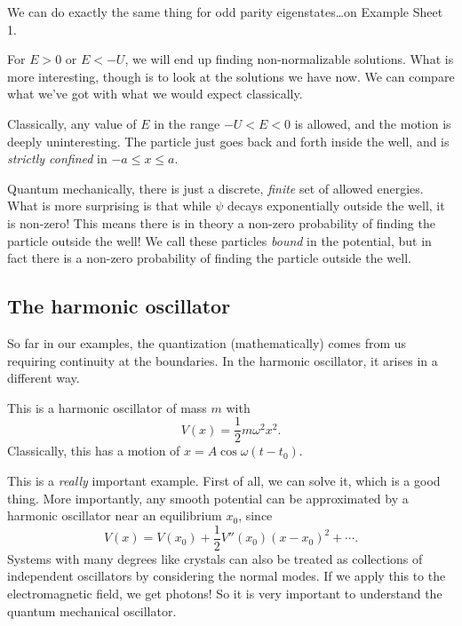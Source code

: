 \documentclass[a4paper]{article}
\begin{document}
We can do exactly the same thing for odd parity eigenstates\ldots on Example Sheet 1.

For $E > 0$ or $E < -U$, we will end up finding non-normalizable solutions. What is more interesting, though is to look at the solutions we have now. We can compare what we've got with what we would expect classically.

Classically, any value of $E$ in the range $-U < E < 0$ is allowed, and the motion is deeply uninteresting. The particle just goes back and forth inside the well, and is \emph{strictly confined} in $-a \leq x \leq a$.

Quantum mechanically, there is just a discrete, \emph{finite} set of allowed energies. What is more surprising is that while $\psi$ decays exponentially outside the well, it is non-zero! This means there is in theory a non-zero probability of finding the particle outside the well! We call these particles \emph{bound} in the potential, but in fact there is a non-zero probability of finding the particle outside the well.

\subsection{The harmonic oscillator}
So far in our examples, the quantization (mathematically) comes from us requiring continuity at the boundaries. In the harmonic oscillator, it arises in a different way.
\begin{center}
\end{center}
This is a harmonic oscillator of mass $m$ with
\[
  V(x) = \frac{1}{2}m\omega^2 x^2.
\]
Classically, this has a motion of $x = A \cos \omega (t - t_0)$.

This is a \emph{really} important example. First of all, we can solve it, which is a good thing. More importantly, any smooth potential can be approximated by a harmonic oscillator near an equilibrium $x_0$, since
\[
  V(x) = V(x_0) + \frac{1}{2}V''(x_0)(x - x_0)^2 + \cdots.
\]
Systems with many degrees like crystals can also be treated as collections of independent oscillators by considering the normal modes. If we apply this to the electromagnetic field, we get photons! So it is very important to understand the quantum mechanical oscillator.
\end{document}
